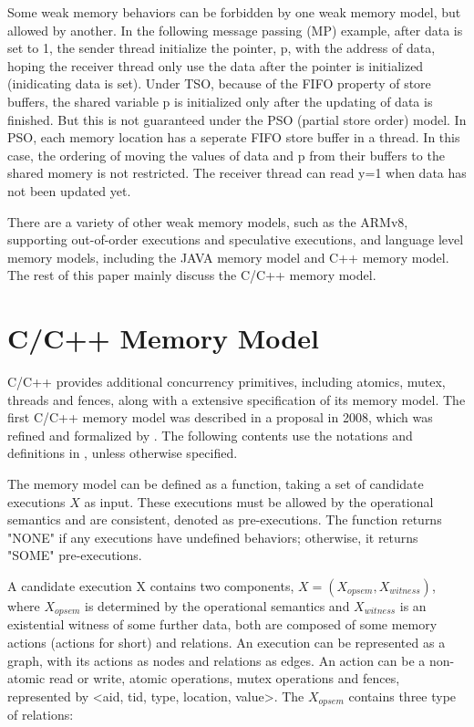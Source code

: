Some weak memory behaviors can be forbidden by one weak memory model, but allowed by another. In the following message passing (MP) example, after data is set to 1, the sender thread initialize the pointer, p, with the address of data, hoping the receiver thread only use the data after the pointer is initialized (inidicating data is set). Under TSO, because of the FIFO property of store buffers, the shared variable p is initialized only after the updating of data is finished. But this is not guaranteed under the PSO (partial store order) model\cite{PSO}. In PSO, each memory location has a seperate FIFO store buffer in a thread. In this case, the ordering of moving the values of data and p from their buffers to the shared momery is not restricted. The receiver thread can read y=1 when data has not been updated yet. 

There are a variety of other weak memory models, such as the ARMv8, supporting out-of-order executions and speculative executions, and language level memory models, including the JAVA memory model\cite{java} and C++ memory model. The rest of this paper mainly discuss the C/C++ memory model\cite{c++model}. 






\section{C/C++ Memory Model}
C/C++ provides additional concurrency primitives, including atomics, mutex, threads and fences, along with a extensive specification of its memory model.
The first C/C++ memory model was described in a proposal\cite{c++model-proposal} in 2008, which was refined and formalized by \cite{c++model}. The following contents use the notations and definitions in \cite{c++model}, unless otherwise specified. 

The memory model can be defined as a function, taking a set of candidate executions $X$ as input. These executions must be allowed by the operational semantics and are consistent, denoted as pre-executions. The function returns "NONE" if any executions have undefined behaviors; otherwise, it returns "SOME" pre-executions.

A candidate execution X contains two components, $X = (X_{opsem}, X_{witness})$, where $X_{opsem}$ is determined by the operational semantics and $X_{witness}$ is an existential witness of some further data, both are composed of some memory actions (actions for short) and relations. An execution can be represented as a graph, with its actions as nodes and relations as edges. An action can be a non-atomic read or write, atomic operations, mutex operations and fences, represented by <aid, tid, type, location, value>. The $X_{opsem}$ contains three type of relations: 

